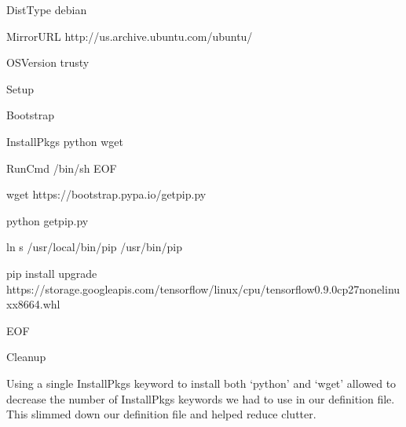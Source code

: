 \documentclass[letterpaper,10pt,english]{sphinxmanual}
\begin{document}
%
\begin{sphinxVerbatim}[commandchars=\\\{\}]
DistType \PYGZdq{}debian\PYGZdq{}

MirrorURL \PYGZdq{}http://us.archive.ubuntu.com/ubuntu/\PYGZdq{}

OSVersion \PYGZdq{}trusty\PYGZdq{}


Setup

Bootstrap


InstallPkgs python wget

RunCmd /bin/sh \PYGZlt{}\PYGZlt{}EOF

wget https://bootstrap.pypa.io/get\PYGZhy{}pip.py

python get\PYGZhy{}pip.py

ln \PYGZhy{}s /usr/local/bin/pip /usr/bin/pip

pip install \PYGZhy{}\PYGZhy{}upgrade https://storage.googleapis.com/tensorflow/linux/cpu/tensorflow\PYGZhy{}0.9.0\PYGZhy{}cp27\PYGZhy{}none\PYGZhy{}linux\PYGZus{}x86\PYGZus{}64.whl

EOF


Cleanup
\end{sphinxVerbatim}

Using a single InstallPkgs keyword to install both ‘python’ and ‘wget’ allowed to decrease the number of InstallPkgs keywords we had to use in our definition file.
This slimmed down our definition file and helped reduce clutter.



\renewcommand{\indexname}{Index}
\printindex
\end{document}
